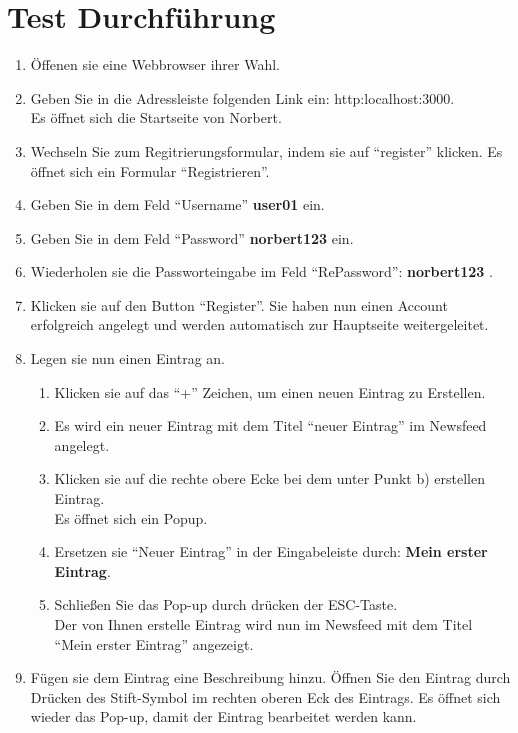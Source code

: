 \section{Test Durchführung}
\begin{enumerate}
\item Öffenen sie eine Webbrowser ihrer Wahl.
\item Geben Sie in die Adressleiste folgenden Link ein: http:localhost:3000. \\Es öffnet sich die Startseite von Norbert.
\item Wechseln Sie zum Regitrierungsformular, indem sie auf \enquote{register} klicken. Es öffnet sich ein Formular \enquote{Registrieren}.
\item Geben Sie in dem Feld \enquote{Username} \textbf{user01} ein.
\item Geben Sie in dem Feld \enquote{Password} \textbf{norbert123} ein.
\item Wiederholen sie die Passworteingabe im Feld \enquote{RePassword}: \textbf{norbert123} .
\item Klicken sie auf den Button \enquote{Register}. Sie haben nun einen Account erfolgreich angelegt und werden automatisch zur Hauptseite weitergeleitet. 
\item Legen sie nun einen Eintrag an.
\begin{enumerate}
\item Klicken sie auf das \enquote{+} Zeichen, um einen neuen Eintrag zu Erstellen.
\item Es wird ein neuer Eintrag mit dem Titel \enquote{neuer Eintrag} im Newsfeed angelegt.
\item Klicken sie auf die rechte obere Ecke bei dem unter Punkt b) erstellen Eintrag.\\ Es öffnet sich ein Popup.
\item Ersetzen sie \enquote{Neuer Eintrag} in der Eingabeleiste durch: \textbf{ Mein erster Eintrag}.
\item Schließen Sie das Pop-up durch drücken der ESC-Taste.\\ Der von Ihnen erstelle Eintrag wird nun im Newsfeed mit dem Titel \enquote{Mein erster Eintrag} angezeigt.
\end{enumerate}
\item Fügen sie dem Eintrag eine Beschreibung hinzu. Öffnen Sie den Eintrag durch Drücken des Stift-Symbol im rechten oberen Eck des Eintrags. Es öffnet sich wieder das Pop-up, damit der Eintrag bearbeitet werden kann.
\begin{enumerate}

\end{enumerate}
\end{enumerate}
